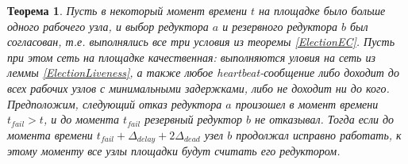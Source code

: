 \documentclass{article}
\theoremstyle{plain}
\newtheorem{theorem}{Теорема}[section]
\theoremstyle{plain}
\theoremstyle{plain}
\theoremstyle{plain}
\theoremstyle{definition}
\theoremstyle{remark}
\theoremstyle{plain}
\begin{document}
\begin{theorem}
\label{ReelectionTheorem}
    Пусть в некоторый момент времени $t$ на площадке было больше одного рабочего узла, и выбор редуктора $a$ и резервного редуктора $b$ был согласован, т.е. выполнялись все три условия из теоремы \ref{ElectionEC}. Пусть при этом сеть на площадке качественная: выполняются уловия на сеть из леммы \ref{ElectionLiveness}, а также любое heartbeat-со\-об\-ще\-ние либо доходит до всех рабочих узлов с минимальными задержками, либо не доходит ни до кого. Предположим, следующий отказ редуктора $a$ произошел в момент времени $t_{fail} > t$, и до момента $t_{fail}$ резервный редуктор $b$ не отказывал. Тогда если до момента времени $t_{fail} + \Delta_{delay} + 2\Delta_{dead}$ узел $b$ продолжал исправно работать, к этому моменту все узлы площадки будут считать его редуктором.
\end{theorem}
\end{document}
